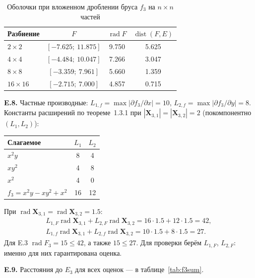 \documentclass[a4paper, 14pt]{extarticle}
\begin{document}
\begin{table}[H]
    \centering
    \small
    \caption{Оболочки при вложенном дроблении бруса $f_3$ на $n\times n$ частей}
    \label{tab:f3sub}
    \begin{tabular}{|l|c|c|c|}
        \hline
        Разбиение & $F$ & $\operatorname{rad}F$ & $\operatorname{dist}(F, E)$ \\ \hline
        $2\times2$ & $[-7.625;\ 11.875]$ & 9.750 & 5.625 \\ \hline
        $4\times4$ & $[-4.484;\ 10.047]$ & 7.266 & 3.047 \\ \hline
        $8\times8$ & $[-3.359;\ 7.961]$ & 5.660 & 1.359 \\ \hline
        $16\times16$ & $[-2.715;\ 7.000]$ & 4.857 & 0.715 \\ \hline
    \end{tabular}
\end{table}


\textbf{E.8.} Частные производные: $L_{1,f} = \max|\partial f_3/\partial x| = 10$, $L_{2,f} = \max|\partial f_3/\partial y| = 8$. Константы расширений по теореме~1.3.1 при $|\mathbf{X}_{3,1}| = |\mathbf{X}_{3,2}| = 2$ (покомпонентно $(L_1, L_2)$):
\begin{center}
    \begin{tabular}{|l|c|c|}
        \hline
        Слагаемое & $L_1$ & $L_2$ \\ \hline
        $x^2y$ & 8 & 4 \\ \hline
        $xy^2$ & 4 & 8 \\ \hline
        $x^2$ & 4 & 0 \\ \hline
        $f_3 = x^2y - xy^2 + x^2$ & 16 & 12 \\ \hline
    \end{tabular}
\end{center}
При $\operatorname{rad}\mathbf{X}_{3,1} = \operatorname{rad}\mathbf{X}_{3,2} = 1.5$:
\begin{gather*}
    L_{1,F}\operatorname{rad}\mathbf{X}_{3,1} + L_{2,F}\operatorname{rad}\mathbf{X}_{3,2} = 16\cdot1.5 + 12\cdot1.5 = 42,\\
    L_{1,f}\operatorname{rad}\mathbf{X}_{3,1} + L_{2,f}\operatorname{rad}\mathbf{X}_{3,2} = 10\cdot1.5 + 8\cdot1.5 = 27.
\end{gather*}
Для E.3 $\operatorname{rad}F_3 = 15 \le 42$, а также $15 \le 27$.
Для проверки берём $L_{1,F}$, $L_{2,F}$: именно для них гарантирована оценка.

\textbf{E.9.} Расстояния до $E_3$ для всех оценок --- в таблице~\ref{tab:f3sum}.
\end{document}
